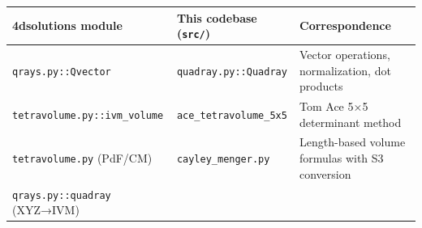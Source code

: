 \documentclass[
]{article}
\begin{document}
\begin{longtable}[]{@{}lll@{}}
\toprule
\begin{minipage}[b]{0.30\columnwidth}\raggedright
4dsolutions module\strut
\end{minipage} & \begin{minipage}[b]{0.35\columnwidth}\raggedright
This codebase (\texttt{src/})\strut
\end{minipage} & \begin{minipage}[b]{0.26\columnwidth}\raggedright
Correspondence\strut
\end{minipage}\tabularnewline
\midrule
\endhead
\begin{minipage}[t]{0.30\columnwidth}\raggedright
\texttt{qrays.py::Qvector}\strut
\end{minipage} & \begin{minipage}[t]{0.35\columnwidth}\raggedright
\texttt{quadray.py::Quadray}\strut
\end{minipage} & \begin{minipage}[t]{0.26\columnwidth}\raggedright
Vector operations, normalization, dot products\strut
\end{minipage}\tabularnewline
\begin{minipage}[t]{0.30\columnwidth}\raggedright
\texttt{tetravolume.py::ivm\_volume}\strut
\end{minipage} & \begin{minipage}[t]{0.35\columnwidth}\raggedright
\texttt{ace\_tetravolume\_5x5}\strut
\end{minipage} & \begin{minipage}[t]{0.26\columnwidth}\raggedright
Tom Ace 5×5 determinant method\strut
\end{minipage}\tabularnewline
\begin{minipage}[t]{0.30\columnwidth}\raggedright
\texttt{tetravolume.py} (PdF/CM)\strut
\end{minipage} & \begin{minipage}[t]{0.35\columnwidth}\raggedright
\texttt{cayley\_menger.py}\strut
\end{minipage} & \begin{minipage}[t]{0.26\columnwidth}\raggedright
Length-based volume formulas with S3 conversion\strut
\end{minipage}\tabularnewline
\begin{minipage}[t]{0.30\columnwidth}\raggedright
\texttt{qrays.py::quadray} (XYZ→IVM)\strut
\end{minipage} & \begin{minipage}[t]{0.35\columnwidth}\raggedright

\end{minipage}
\end{longtable}
\end{document}
